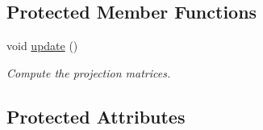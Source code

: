 \subsection*{Protected Member Functions}
\begin{DoxyCompactItemize}
\item 
void \hyperlink{class_graphics_1_1_stereo_helper_ab355550a23d88f275eed384e3304a2df}{update} ()
\begin{DoxyCompactList}\small\item\em Compute the projection matrices. \end{DoxyCompactList}\end{DoxyCompactItemize}
\subsection*{Protected Attributes}
